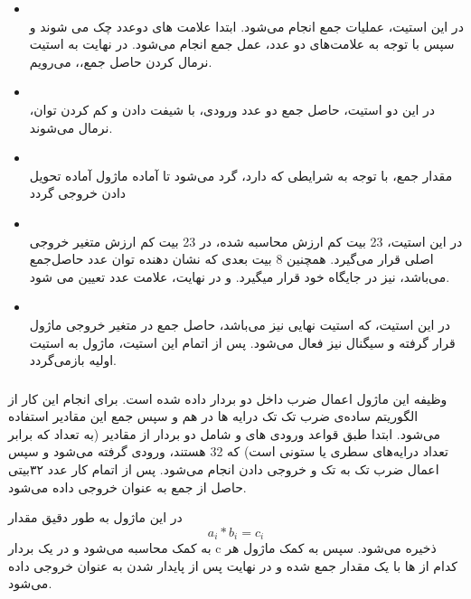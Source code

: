 \documentclass[12pt,titlepage,a4page , tikz , multi,table , svgnames,xcdraw]{article}
\begin{document}
\begin{itemize}
\item {} \\
در این استیت، عملیات جمع انجام می‌شود. ابتدا علامت های دوعدد چک می شوند و سپس با توجه به علامت‌های دو عدد، عمل جمع  انجام می‌شود. 
در نهایت به استیت نرمال کردن حاصل جمع،، می‌رویم.

\item {} \\
در این دو استیت، حاصل جمع دو عدد ورودی، با شیفت دادن و کم کردن توان، نرمال می‌شوند.

\item {} \\
 مقدار جمع،  با توجه به شرایطی که دارد، گرد می‌شود تا آماده ماژول آماده تحویل دادن خروجی گردد

\item {} \\
در این استیت، 23 بیت کم ارزش  محاسبه شده، در 23 بیت کم ارزش متغیر خروجی اصلی قرار می‌گیرد. همچنین 8 بیت بعدی که نشان دهنده توان عدد حاصل‌جمع می‌باشد، نیز در جایگاه خود قرار میگیرد. و در نهایت، علامت عدد تعیین می شود. 
\item {} \\
        در این استیت، که استیت نهایی نیز می‌باشد، حاصل جمع در متغیر خروجی ماژول قرار گرفته و سیگنال  نیز فعال می‌شود. پس از اتمام این استیت، ماژول به استیت اولیه بازمی‌گردد.
\end{itemize}




\subsubsection{}
وظیفه این ماژول اعمال ضرب داخل دو بردار داده شده است.
برای انجام این کار از الگوریتم ساده‌ی ضرب تک تک درایه ها در هم و سپس جمع این مقادیر استفاده می‌شود.
ابتدا طبق قواعد 
 ورودی های 
 و 
 شامل دو بردار از مقادیر 
(به تعداد  که برابر تعداد درایه‌های سطری یا ستونی است)
که 32 
 هستند، ورودی گرفته می‌شود و سپس اعمال ضرب تک به تک و خروجی دادن انجام می‌شود.
پس از اتمام کار عدد ۳۲بیتی حاصل از جمع به عنوان خروجی داده می‌شود.

در این ماژول به طور دقیق مقدار
\[a_i * b_i = c_i\]
به کمک 
 محاسبه می‌شود و در یک بردار c ذخیره می‌شود.
سپس به کمک ماژول 
 هر کدام از 
ها با یک مقدار 
 جمع شده و در نهایت پس از پایدار شدن به عنوان خروجی داده می‌شود.
\end{document}
